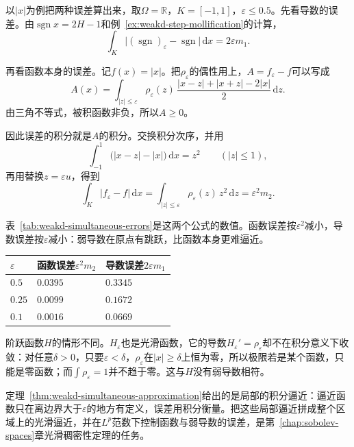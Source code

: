 以$\lvert x\rvert$为例把两种误差算出来，取$\Omega=\mathbb R$，$K=[-1,1]$，$\varepsilon\leq0.5$。先看导数的误差。由$\operatorname{sgn}x=2H-1$和例~\ref{ex:weakd-step-mollification}的计算，
\[
\int_K\bigl\lvert(\operatorname{sgn})_\varepsilon-\operatorname{sgn}\bigr\rvert\,\mathrm dx=2\varepsilon m_1 .
\]

再看函数本身的误差。记$f(x)=\lvert x\rvert$。把$\rho_\varepsilon$的偶性用上，$A=f_\varepsilon-f$可以写成
\[
A(x)=\int_{\lvert z\rvert\leq\varepsilon}\rho_\varepsilon(z)\,\frac{\lvert x-z\rvert+\lvert x+z\rvert-2\lvert x\rvert}{2}\,\mathrm dz .
\]
由三角不等式，被积函数非负，所以$A\geq0$。

因此误差的积分就是$A$的积分。交换积分次序，并用
\[
\int_{-1}^1\bigl(\lvert x-z\rvert-\lvert x\rvert\bigr)\,\mathrm dx=z^2\qquad(\lvert z\rvert\leq1),
\]
再用替换$z=\varepsilon u$，得到
\[
\int_K\lvert f_\varepsilon-f\rvert\,\mathrm dx=\int_{\lvert z\rvert\leq\varepsilon}\rho_\varepsilon(z)\,z^2\,\mathrm dz=\varepsilon^2m_2 .
\]

表~\ref{tab:weakd-simultaneous-errors}是这两个公式的数值。函数误差按$\varepsilon^2$减小，导数误差按$\varepsilon$减小：弱导数在原点有跳跃，比函数本身更难逼近。

\begin{BookInlineTable}
  \centering
  \begin{tabular}{@{}lll@{}}
    \toprule
    $\varepsilon$ & 函数误差$\varepsilon^2m_2$ & 导数误差$2\varepsilon m_1$\\
    \midrule
    $0.5$ & $0.0395$ & $0.3345$\\
    $0.25$ & $0.0099$ & $0.1672$\\
    $0.1$ & $0.0016$ & $0.0669$\\
    \bottomrule
  \end{tabular}
  \caption{$\lvert x\rvert$的同时逼近误差，$K=[-1,1]$，$m_1\approx0.3345$，$m_2\approx0.1581$。}
  \label{tab:weakd-simultaneous-errors}
\end{BookInlineTable}

阶跃函数$H$的情形不同。$H_\varepsilon$也是光滑函数，它的导数$H_\varepsilon'=\rho_\varepsilon$却不在积分意义下收敛：对任意$\delta>0$，只要$\varepsilon<\delta$，$\rho_\varepsilon$在$\lvert x\rvert\geq\delta$上恒为零，所以极限若是某个函数，只能是零函数；而$\int\rho_\varepsilon=1$并不趋于零。这与$H$没有弱导数相符。

定理~\ref{thm:weakd-simultaneous-approximation}给出的是局部的积分逼近：逼近函数只在离边界大于$\varepsilon$的地方有定义，误差用积分衡量。把这些局部逼近拼成整个区域上的光滑逼近，并在$L^p$范数下控制函数与弱导数的误差，是第~\ref{chap:sobolev-spaces}章光滑稠密性定理的任务。
